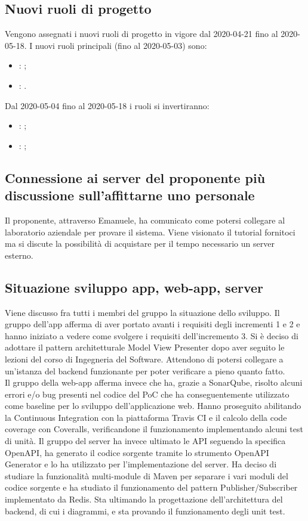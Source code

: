 \subsection{Nuovi ruoli di progetto}
Vengono assegnati i nuovi ruoli di progetto in vigore dal 2020-04-21 fino al 2020-05-18.\newline
I nuovi ruoli principali (fino al 2020-05-03) sono:
\begin{itemize}
	\item \DF{}: \Amministratore{};
	\item \BR{}: \Responsabile{}.
\end{itemize}
Dal 2020-05-04 fino al 2020-05-18 i ruoli si invertiranno:
\begin{itemize}
	\item \BR{}: \Amministratore{};
	\item \DF{}: \Responsabile{};
\end{itemize}

\subsection{Connessione ai server del proponente più discussione sull'affittarne uno personale}
Il proponente, attraverso Emanuele, ha comunicato come potersi collegare al laboratorio aziendale per provare il sistema.
Viene visionato il tutorial fornitoci ma si discute la possibilità di acquistare per il tempo necessario un server esterno.

\subsection{Situazione sviluppo app, web-app, server}
Viene discusso fra tutti i membri del gruppo la situazione dello sviluppo.
Il gruppo dell'app afferma di aver portato avanti i requisiti degli incrementi 1 e 2 e hanno iniziato a vedere come svolgere i requisiti dell'incremento 3.
Si è deciso di adottare il pattern architetturale Model View Presenter dopo aver seguito le lezioni del corso di Ingegneria del Software. Attendono di potersi
collegare a un'istanza del backend funzionante per poter verificare a pieno quanto fatto.\\
Il gruppo della web-app afferma invece che ha, grazie a SonarQube, risolto alcuni errori e/o bug presenti nel codice del PoC che ha conseguentemente utilizzato 
come baseline per lo sviluppo dell'applicazione web. Hanno proseguito abilitando la Continuous Integration con la piattaforma Travis CI e il calcolo della code coverage
con Coveralls, verificandone il funzionamento implementando alcuni test di unità.
Il gruppo del server ha invece ultimato le API seguendo la specifica OpenAPI, ha generato il codice sorgente tramite lo strumento OpenAPI Generator e lo ha utilizzato per l'implementazione del server.
Ha deciso di studiare la funzionalità multi-module di Maven per separare i vari moduli del codice sorgente e ha studiato il funzionamento del pattern Publisher/Subscriber implementato da Redis.
Sta ultimando la progettazione dell'architettura del backend, di cui i diagrammi, e sta provando il funzionamento degli unit test.

